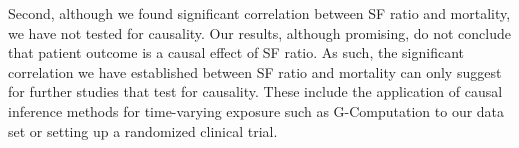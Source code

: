 Second, although we found significant correlation between SF ratio and mortality, we have not tested for causality. Our results, although promising, do not conclude that patient outcome is a causal effect of SF ratio. As such, the significant correlation we have established between SF ratio and mortality can only suggest for further studies that test for causality. These include the application of causal inference methods for time-varying exposure such as G-Computation to our data set \citep{snowden2011implementation} or setting up a randomized clinical trial. 
%
%
%
%
